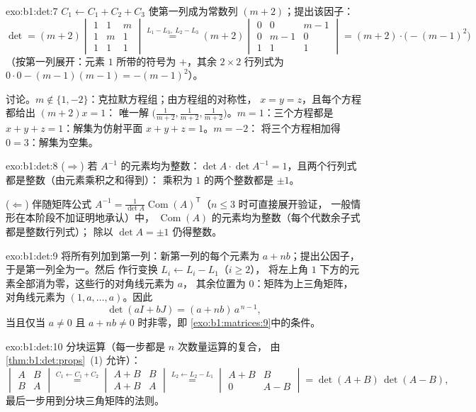 \begin{solution}{exo:b1:det:7}
$C_1 \leftarrow C_1 + C_2 + C_3$ 使第一列成为常数列
$(m+2)$；提出该因子：
\[
\det = (m+2)\begin{vmatrix}
1 & 1 & m\\ 1 & m & 1\\ 1 & 1 & 1
\end{vmatrix}
\overset{L_1 - L_3,\ L_2 - L_3}{=}
(m+2)\begin{vmatrix}
0 & 0 & m-1\\ 0 & m-1 & 0\\ 1 & 1 & 1
\end{vmatrix}
= (m+2)\cdot\bigl(-(m-1)^2\bigr)
\]
（按第一列展开：元素 $1$ 所带的符号为
$+$，其余 $2 \times 2$ 行列式为 $0 \cdot 0 -
(m-1)(m-1) = -(m-1)^2$）。

讨论。$m \notin \{1, -2\}$：克拉默方程组；由方程组的对称性，
$x = y = z$，且每个方程都给出 $(m + 2)x = 1$：
唯一解 $\bigl(\frac{1}{m+2}, \frac{1}{m+2},
\frac{1}{m+2}\bigr)$。$m = 1$：三个方程都是 $x + y
+ z = 1$：解集为仿射平面 $x + y + z = 1$。$m = -2$：
将三个方程相加得 $0 = 3$：解集为空集。
\end{solution}

\begin{solution}{exo:b1:det:8}
($\Rightarrow$) 若 $A^{-1}$ 的元素均为整数：$\det A \cdot \det
A^{-1} = 1$，且两个行列式都是整数（由元素乘积之和得到）：
乘积为 $1$ 的两个整数都是 $\pm1$。

($\Leftarrow$) 伴随矩阵公式 $A^{-1} = \frac{1}{\det
A}\operatorname{Com}(A)^{\mathsf T}$（$n \leq 3$ 时可直接展开验证，
一般情形在本阶段不加证明地承认）中，
$\operatorname{Com}(A)$ 的元素均为整数（每个代数余子式都是整数行列式）；
除以 $\det A = \pm 1$ 仍得整数。
\end{solution}

\begin{solution}{exo:b1:det:9}
将所有列加到第一列：新第一列的每个元素为
$a + nb$；提出公因子，于是第一列全为一。然后
作行变换 $L_i \leftarrow L_i - L_1$（$i \geq 2$），
将左上角 $1$ 下方的元素全部消为零，这些行的对角线元素为 $a$，
其余位置为 $0$：矩阵为上三角矩阵，
对角线元素为 $(1, a, \dots, a)$。因此
\[
\det(aI + bJ) = (a + nb)\, a^{\,n-1} ,
\]
当且仅当 $a \neq 0$ 且 $a + nb \neq 0$ 时非零，即
\cref{exo:b1:matrices:9}中的条件。
\end{solution}

\begin{solution}{exo:b1:det:10}
分块运算（每一步都是 $n$ 次数量运算的复合，
由\cref{thm:b1:det:props}~(1) 允许）：
\[
\begin{vmatrix} A & B\\ B & A\end{vmatrix}
\overset{C_1 \leftarrow C_1 + C_2}{=}
\begin{vmatrix} A + B & B\\ A + B & A\end{vmatrix}
\overset{L_2 \leftarrow L_2 - L_1}{=}
\begin{vmatrix} A + B & B\\ 0 & A - B\end{vmatrix}
= \det(A+B)\,\det(A-B),
\]
最后一步用到分块三角矩阵的法则。
\end{solution}

